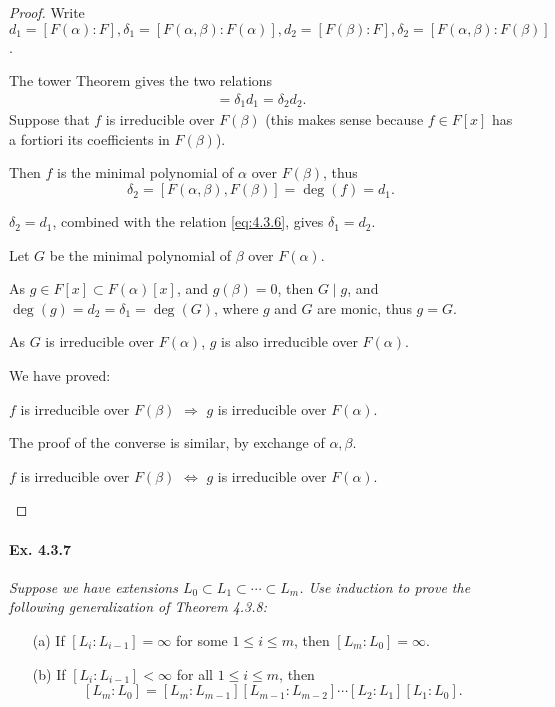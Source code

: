 \documentclass[11pt,a4paper]{article}
\begin{document}
\begin{proof}
Write $d_1 =[F(\alpha) : F], \delta_1= [F(\alpha,\beta):F(\alpha)], d_2 = [F(\beta):F],\delta_2 = [F(\alpha,\beta):F(\beta)]$.

The tower Theorem  gives the two relations
\begin{align}
[F(\alpha,\beta) :F] = \delta_1 d_1 = \delta_2 d_2. \label{eq:4.3.6}
\end{align}
Suppose that $f$ is irreducible over $F(\beta)$ (this makes sense because $f \in F[x]$ has a fortiori its coefficients in $F(\beta)$).

Then $f$ is the minimal polynomial of  $\alpha$ over $F(\beta)$, thus $$ \delta_2  = [F(\alpha,\beta),F(\beta)] = \deg(f) =d_1.$$

$\delta_2 = d_1$, combined with the relation \eqref{eq:4.3.6}, gives $\delta_1= d_2$.

Let $G$ be the minimal polynomial of  $\beta$ over $F(\alpha)$.

As $g \in F[x] \subset F(\alpha)[x]$, and $g(\beta)=0$, then $G \mid g$, and $\deg(g) = d_2 = \delta_1 = \deg(G)$, where $g$ and  $G$ are monic, thus $g=G$.

As $G$ is irreducible over $F(\alpha)$, $g$ is also irreducible over $F(\alpha)$.

We have proved:
\begin{center}
$f$ is irreducible over $F(\beta)$ $\Rightarrow$ $g$ is irreducible over $F(\alpha)$.
\end{center}
The proof of the converse is similar, by exchange of $\alpha,\beta$.

\begin{center}
$f$ is irreducible over $F(\beta)$ $\iff$ $g$ is irreducible over $F(\alpha)$.
\end{center}
\end{proof}

\paragraph{Ex. 4.3.7}

{\it Suppose we have extensions $L_0 \subset L_1 \subset \cdots \subset L_m$. Use induction to prove the following generalization of Theorem 4.3.8:
\begin{enumerate}
\item[(a)] If $[L_i:L_{i-1}] = \infty$ for some $1\leq i \leq m$, then $[L_m:L_0] = \infty$.
\item[(b)] If $[L_i:L_{i-1}] < \infty$ for all $1\leq i \leq m$, then
$$[L_m:L_0] = [L_m:L_{m-1}][L_{m-1}:L_{m-2}]\cdots[L_2:L_1][L_1:L_0].$$
\end{enumerate}
}
\end{document}
